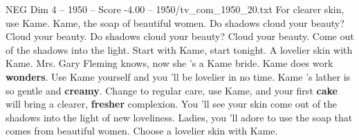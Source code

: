 \begin{textsample}{NEG Dim 4 – 1950 – Score -4.00 – 1950/tv\_com\_1950\_20.txt}  \label{ex:f4_neg_009}
For clearer skin, use Kame.
Kame, the soap of beautiful women.
Do shadows cloud your beauty?
Cloud your beauty.
Do shadows cloud your beauty?
Cloud your beauty.
Come out of the shadows into the light.
Start with Kame, start tonight.
A lovelier skin with Kame.
Mrs.
Gary Fleming knows, now she 's a Kame bride.
Kame does work \textbf{wonders}.
Use Kame yourself and you 'll be lovelier in no time.
Kame 's lather is so gentle and \textbf{creamy}.
Change to regular care, use Kame, and your first \textbf{cake} will bring a clearer, \textbf{fresher} complexion.
You 'll see your skin come out of the shadows into the light of new loveliness.
Ladies, you 'll adore to use the soap that comes from beautiful women.
Choose a lovelier skin with Kame.

\end{textsample}
